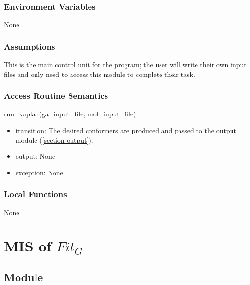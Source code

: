 \documentclass[12pt, titlepage]{article}
\begin{document}
\subsubsection{Environment Variables}

None

\subsubsection{Assumptions}

This is the main control unit for the program; the user will write their own 
input files and only need to access this module to complete their task.

\subsubsection{Access Routine Semantics}

\noindent run\_kaplan(ga\_input\_file, mol\_input\_file):
\begin{itemize}
	\item transition: The desired conformers are produced and passed to the 
	output module (\ref{section-output}).
	\item output: None
	\item exception: None
\end{itemize}

\subsubsection{Local Functions}

None

\newpage

\section{MIS of $Fit_G$} \label{section-fitg} %



\subsection{Module}
\end{document}
